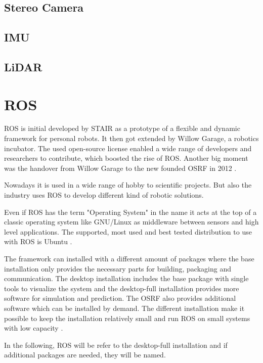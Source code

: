 \subsection{Stereo Camera}\label{ssec:HWstereoCamera}

\subsection{IMU}\label{ssec:HWIMU}

\subsection{LiDAR}\label{ssec:HWLiDAR}

\section{ROS}\label{sec:ros}
\ac{ROS} is initial developed by \ac{STAIR} as a prototype of a flexible and dynamic framework for personal robots.
It then got extended by Willow Garage, a robotics incubator.
The used open-source license enabled a wide range of developers and researchers to contribute, which boosted the rise of \ac{ROS}.
Another big moment was the handover from Willow Garage to the new founded \ac{OSRF} in 2012 \cite{rosHistory}.

Nowadays it is used in a wide range of hobby to scientific projects.
But also the industry uses \ac{ROS} to develop different kind of robotic solutions.

Even if \ac{ROS} has the term "Operating System" in the name it acts at the top of a classic operating system like GNU/Linux as middleware between sensors and high level applications.
The supported, most used and best tested distribution to use with \ac{ROS} is Ubuntu \cite{rosInstallationOS}.

The framework can installed with a different amount of packages where the base installation only provides the necessary parts for building, packaging and communication.
The desktop installation includes the base package with single tools to visualize the system and the desktop-full installation provides more software for simulation and prediction.
The \ac{OSRF} also provides additional software which can be installed by demand.
The different installation make it possible to keep the installation relatively small and run \ac{ROS} on small systems with low capacity \cite{rosInstallations}.

In the following, \ac{ROS} will be refer to the desktop-full installation and if additional packages are needed, they will be named.

